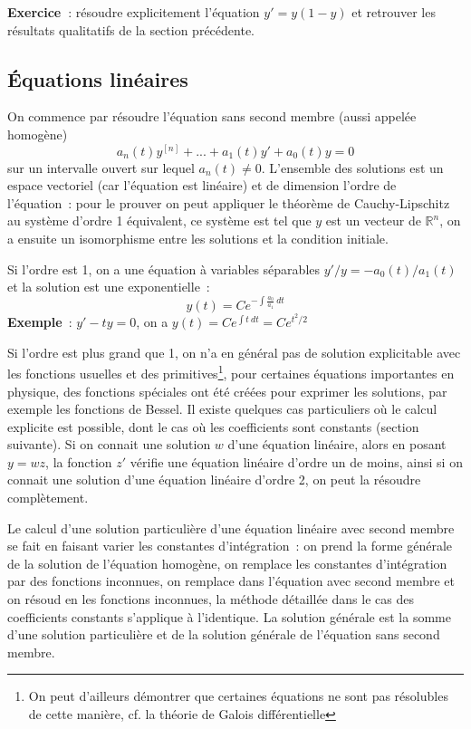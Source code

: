\documentclass[a4paper,11pt]{book}
\begin{document}
\begin{giacjshere}
{\bf Exercice~}: r\'esoudre explicitement l'\'equation $y'=y(1-y)$
et retrouver les r\'esultats qualitatifs de la section pr\'ec\'edente. \\

\subsection{\'Equations lin\'eaires}
On commence par r\'esoudre l'\'equation sans second membre
(aussi appel\'ee homog\`ene)
$$ a_n(t) y^{[n]} +...+a_1(t)y'+a_0(t)y=0$$
sur un intervalle ouvert sur lequel $a_n(t) \neq 0$. 
L'ensemble des solutions est un espace vectoriel (car l'\'equation
est lin\'eaire) et de dimension l'ordre de
l'\'equation~: pour le prouver on peut appliquer le th\'eor\`eme
de Cauchy-Lipschitz au syst\`eme d'ordre 1 \'equivalent, ce
syst\`eme est tel que $y$ est un vecteur de $\mathbb{R}^n$, on a ensuite
un isomorphisme entre les solutions et la condition initiale.

Si l'ordre est 1, on a une \'equation \`a variables s\'eparables
$ y'/y=-a_0(t)/a_1(t)$ et la solution est une exponentielle~:
$$ y(t)=Ce^{-\int \frac{a_0}{a_1} \ dt}$$
{\bf Exemple}~: $y'-ty=0$, on a $y(t)=Ce^{\int t \ dt}=Ce^{t^2/2}$

Si l'ordre est plus grand que 1, on n'a en g\'en\'eral pas de solution
explicitable avec les fonctions usuelles et des primitives\footnote{On peut
d'ailleurs d\'emontrer que certaines \'equations ne sont pas r\'esolubles de
cette mani\`ere, cf. la th\'eorie de Galois diff\'erentielle}, 
pour certaines \'equations importantes en physique, 
des fonctions sp\'eciales
ont \'et\'e cr\'e\'ees pour exprimer les solutions, par
exemple les fonctions de Bessel. Il existe quelques
cas particuliers o\`u le calcul explicite est possible, dont
le cas o\`u les coefficients sont constants (section suivante).
Si on connait une solution $w$ d'une \'equation lin\'eaire, alors 
en posant $y=wz$, la fonction $z'$ v\'erifie une \'equation lin\'eaire
d'ordre un de moins, ainsi si on connait une solution d'une \'equation
lin\'eaire d'ordre 2, on peut la r\'esoudre compl\`etement.

Le calcul d'une solution particuli\`ere 
d'une \'equation lin\'eaire avec second
membre se fait en faisant varier les constantes d'int\'egration~:
on prend la forme g\'en\'erale de la solution de l'\'equation
homog\`ene,
on remplace les constantes d'int\'egration par des fonctions inconnues,
on remplace dans l'\'equation avec second membre et on
r\'esoud en les fonctions inconnues, la m\'ethode d\'etaill\'ee
dans le cas des coefficients constants s'applique \`a l'identique.
La solution g\'en\'erale est la somme d'une solution particuli\`ere
et de la solution g\'en\'erale de l'\'equation sans second membre.


\end{giacjshere}
\end{document}
